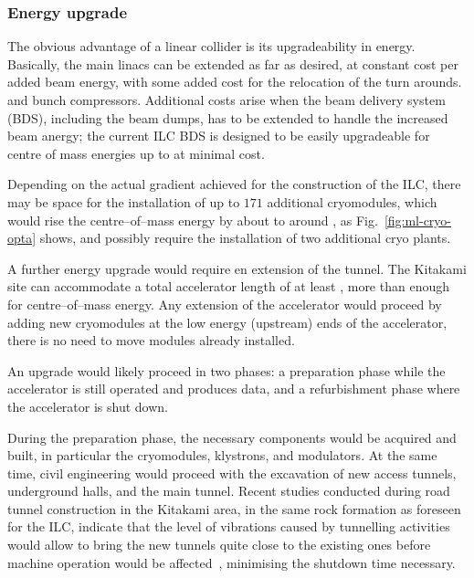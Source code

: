 \subsubsection{Energy upgrade}
\label{subsubsec:upg-optE}

The obvious advantage of a linear collider is its upgradeability in energy.
Basically, the main linacs can be extended as far as desired, at constant cost per added beam energy, with some added cost for the relocation of the turn arounds. and bunch compressors.
Additional costs arise when the beam delivery system (BDS), including the beam dumps, has to be extended to handle the increased beam anergy; 
the current ILC BDS is designed to be easily upgradeable for centre of mass energies up to  at minimal cost.

Depending on the actual gradient achieved for the construction of the ILC, there may be space for the installation of up to $171$ additional cryomodules, which would rise the centre--of--mass energy by about  to around , as Fig.~\ref{fig:ml-cryo-opta} shows, 
and possibly require the installation of two additional cryo plants.

A further energy upgrade would require en extension of the tunnel.
The Kitakami site can accommodate a total accelerator length of at least , more than enough for  centre--of--mass energy.
Any extension of the accelerator would proceed by adding new cryomodules at the low energy (upstream) ends of the accelerator, there is no need to move modules already installed. 

An upgrade would likely proceed in two phases: a preparation phase while the accelerator is still operated and produces data, and a refurbishment phase where the accelerator is shut down.

During the preparation phase, the necessary components would be acquired and built, in particular the cryomodules, klystrons, and modulators. 
At the same time, civil engineering would proceed with the excavation of new access tunnels, underground halls, and the main tunnel.
Recent studies conducted during road tunnel construction in the Kitakami area, in the same rock formation as foreseen for the ILC, indicate that the level of vibrations caused by tunnelling activities would allow to bring the new tunnels quite close to the existing ones before machine operation would be affected~\cite{bib:sanuki:lcws2018}, minimising the shutdown time necessary.

